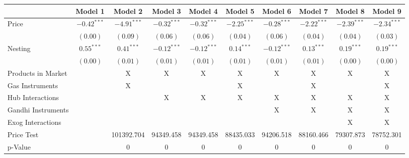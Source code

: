 
\begin{tabular}{l c c c c c c c c c}
\toprule
 & Model 1 & Model 2 & Model 3 & Model 4 & Model 5 & Model 6 & Model 7 & Model 8 & Model 9 \\
\midrule
Price                       & $-0.42^{***}$ & $-4.91^{***}$ & $-0.32^{***}$ & $-0.32^{***}$ & $-2.25^{***}$ & $-0.28^{***}$ & $-2.22^{***}$ & $-2.39^{***}$ & $-2.34^{***}$ \\
                            & $(0.00)$      & $(0.09)$      & $(0.06)$      & $(0.06)$      & $(0.04)$      & $(0.06)$      & $(0.04)$      & $(0.04)$      & $(0.03)$      \\
Nesting                     & $0.55^{***}$  & $0.41^{***}$  & $-0.12^{***}$ & $-0.12^{***}$ & $0.14^{***}$  & $-0.12^{***}$ & $0.13^{***}$  & $0.19^{***}$  & $0.19^{***}$  \\
                            & $(0.00)$      & $(0.01)$      & $(0.01)$      & $(0.01)$      & $(0.01)$      & $(0.01)$      & $(0.01)$      & $(0.00)$      & $(0.00)$      \\
\midrule
Products in Market          &               & X             & X             & X             & X             & X             & X             & X             & X             \\
Gas Instruments             &               & X             &               &               & X             &               & X             &               & X             \\
Hub Interactions            &               &               & X             & X             & X             & X             & X             & X             & X             \\
Gandhi Instruments          &               &               &               &               &               & X             & X             & X             & X             \\
Exog Interactions           &               &               &               &               &               &               &               & X             & X             \\
Price Test                  &               & 101392.704    & 94349.458     & 94349.458     & 88435.033     & 94206.518     & 88160.466     & 79307.873     & 78752.301     \\
p-Value                     &               & 0             & 0             & 0             & 0             & 0             & 0             & 0             & 0             \\

\end{tabular}
